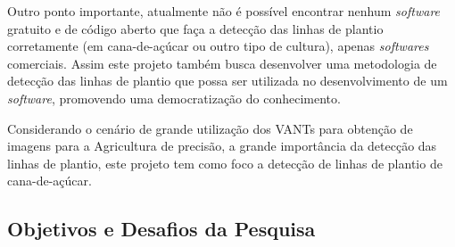 \documentclass[12pt, a4paper, english, brazil]{article}
\begin{document}
Outro ponto importante, atualmente não é possível encontrar nenhum \textit{software} gratuito e de código aberto que faça a detecção das linhas de plantio corretamente (em cana-de-açúcar ou outro tipo de cultura), apenas \textit{softwares} comerciais. Assim este projeto também busca desenvolver uma metodologia de detecção das linhas de plantio que possa ser utilizada no desenvolvimento de um \textit{software}, promovendo uma democratização do conhecimento.

Considerando o cenário de grande utilização dos VANTs para obtenção de imagens para a Agricultura de precisão, a grande importância da detecção das linhas de plantio, este projeto tem como foco a detecção de linhas de plantio de cana-de-açúcar.

 
\subsection{Objetivos e Desafios da Pesquisa}
\end{document}
